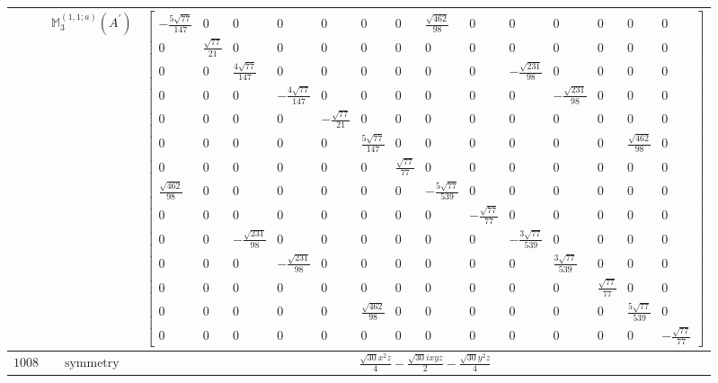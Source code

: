 \documentclass[fleqn,8pt,landscape]{jsarticle}
\begin{document}
\begin{longtable}{ccc}
$  $ & $ \mathbb{M}_{3}^{(1,1;a)}(A^{\prime}) $ & $ \begin{bmatrix} - \frac{5 \sqrt{77}}{147} & 0 & 0 & 0 & 0 & 0 & 0 & \frac{\sqrt{462}}{98} & 0 & 0 & 0 & 0 & 0 & 0 \\ 0 & \frac{\sqrt{77}}{21} & 0 & 0 & 0 & 0 & 0 & 0 & 0 & 0 & 0 & 0 & 0 & 0 \\ 0 & 0 & \frac{4 \sqrt{77}}{147} & 0 & 0 & 0 & 0 & 0 & 0 & - \frac{\sqrt{231}}{98} & 0 & 0 & 0 & 0 \\ 0 & 0 & 0 & - \frac{4 \sqrt{77}}{147} & 0 & 0 & 0 & 0 & 0 & 0 & - \frac{\sqrt{231}}{98} & 0 & 0 & 0 \\ 0 & 0 & 0 & 0 & - \frac{\sqrt{77}}{21} & 0 & 0 & 0 & 0 & 0 & 0 & 0 & 0 & 0 \\ 0 & 0 & 0 & 0 & 0 & \frac{5 \sqrt{77}}{147} & 0 & 0 & 0 & 0 & 0 & 0 & \frac{\sqrt{462}}{98} & 0 \\ 0 & 0 & 0 & 0 & 0 & 0 & \frac{\sqrt{77}}{77} & 0 & 0 & 0 & 0 & 0 & 0 & 0 \\ \frac{\sqrt{462}}{98} & 0 & 0 & 0 & 0 & 0 & 0 & - \frac{5 \sqrt{77}}{539} & 0 & 0 & 0 & 0 & 0 & 0 \\ 0 & 0 & 0 & 0 & 0 & 0 & 0 & 0 & - \frac{\sqrt{77}}{77} & 0 & 0 & 0 & 0 & 0 \\ 0 & 0 & - \frac{\sqrt{231}}{98} & 0 & 0 & 0 & 0 & 0 & 0 & - \frac{3 \sqrt{77}}{539} & 0 & 0 & 0 & 0 \\ 0 & 0 & 0 & - \frac{\sqrt{231}}{98} & 0 & 0 & 0 & 0 & 0 & 0 & \frac{3 \sqrt{77}}{539} & 0 & 0 & 0 \\ 0 & 0 & 0 & 0 & 0 & 0 & 0 & 0 & 0 & 0 & 0 & \frac{\sqrt{77}}{77} & 0 & 0 \\ 0 & 0 & 0 & 0 & 0 & \frac{\sqrt{462}}{98} & 0 & 0 & 0 & 0 & 0 & 0 & \frac{5 \sqrt{77}}{539} & 0 \\ 0 & 0 & 0 & 0 & 0 & 0 & 0 & 0 & 0 & 0 & 0 & 0 & 0 & - \frac{\sqrt{77}}{77} \end{bmatrix} $ \\ \hline
$ 1008 $ & $ \text{symmetry} $ & $ \frac{\sqrt{30} x^{2} z}{4} - \frac{\sqrt{30} i x y z}{2} - \frac{\sqrt{30} y^{2} z}{4} $ \\

\end{longtable}
\end{document}
